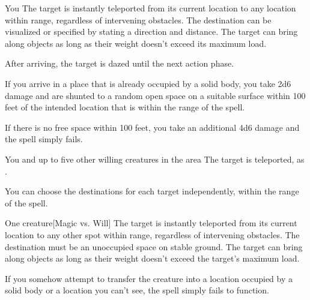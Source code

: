 \spellrng{\rngext \rngunrestricted}
\begin{spelltarget}{You}
    \spelleffect The target is instantly teleported from its current location to any location within range, regardless of intervening obstacles. The destination can be visualized or specified by stating a direction and distance. The target can bring along objects as long as their weight doesn't exceed its maximum load.

    After arriving, the target is dazed until the next action phase.
\end{spelltarget}
\spellnotes \par If you arrive in a place that is already occupied by a solid body, you take 2d6 damage and are shunted to a random open space on a suitable surface within 100 feet of the intended location that is within the range of the spell.
\par  If there is no free space within 100 feet, you take an additional 4d6 damage and the spell simply fails.

\begin{spelltarget}{You and up to five other willing creatures in the area}
    \spelleffect The target is teleported, as .
\end{spelltarget}
\spellnotes You can choose the destinations for each target independently, within the range of the spell. 

\spellrng{\rngclose}
\begin{spelltarget}{One creature}[Magic vs. Will]
    \spelleffect The target is instantly teleported from its current location to any other spot within range, regardless of intervening obstacles. The destination must be an unoccupied space on stable ground. The target can bring along objects as long as their weight doesn't exceed the target's maximum load.
\end{spelltarget}
\spellnotes If you somehow attempt to transfer the creature into a location occupied by a solid body or a location you can't see, the spell simply fails to function.

